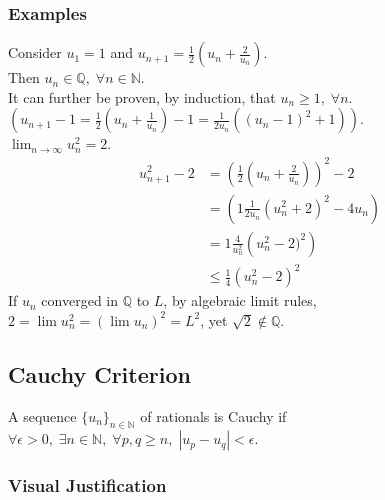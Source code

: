\documentclass[11pt]{article}
\newcommand{\0}{\emptyset}
\newcommand{\N}{\mathbb{N}}
\newcommand{\Q}{\mathbb{Q}}
\begin{document}
\subsubsection*{Examples}
\label{sec:orga9cb4f5}
Consider \(u_{1}=1\) and \(u_{n+1}=\frac{1}{2} (u_{n}+\frac{2}{u_{n}})\).\\[0pt]
Then \(u_{n}\in\Q,\;\forall n\in\N\).\\[0pt]
It can further be proven, by induction, that \(u_{n}\geq1,\;\forall n\). \(\left( u_{n+1}-1=\frac{1}{2} (u_{n}+\frac{1}{u_{n}})-1=\frac{1}{2u_{n}} ((u_{n}-1)^{2}+1)  \right)\).\\[0pt]
\(\lim_{n\to\infty}u_{n}^{2}=2\).\\[0pt]
\begin{align*}
  u_{n+1}^{2}-2
  &=\left( \frac{1}{2} (u_{n}+\frac{2}{u_{n}}) \right)^{2}-2
  \\&=\left( 1\frac{1}{2u_{n}} (u_{n}^{2}+2)^{2}-4u_{n} \right)
  \\&=1\frac{4}{u_{n}^{2}} \left( u_{n}^{2}-2)^{2} \right)
  \\&\leq \frac{1}{4} (u_{n}^{2}-2)^{2}
\end{align*}
If \(u_{n}\) converged in \(\Q\) to \(L\), by algebraic limit rules, \(2=\lim u_{n}^{2}=(\lim u_{n})^{2}=L^{2}\), yet \(\sqrt{2}\not\in\Q\).\\[0pt]
\subsection*{Cauchy Criterion}
\label{sec:orgf409b3b}
A sequence \(\{u_{n}\}_{n\in\N}\) of rationals is Cauchy if \(\forall\epsilon>0,\;\exists n\in\N,\;\forall p,q\geq n,\; |u_{p}-u_{q}|<\epsilon\).\\[0pt]
\subsubsection*{Visual Justification}
\label{sec:orgec2e74d}
\end{document}
